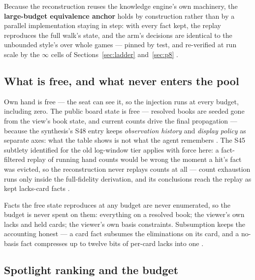 \documentclass[11pt]{article}
\begin{document}
Because the reconstruction reuses the knowledge engine's own machinery, the
\textbf{large-budget equivalence anchor} holds by construction rather than by a parallel
implementation staying in step: with every fact kept, the replay reproduces the full
walk's state, and the arm's decisions are identical to the unbounded style's over whole
games --- pinned by test, and re-verified at run scale by the $\infty$ cells of
Sections~\ref{sec:ladder} and~\ref{sec:p8} \cite{repo,artifact}.

\subsection{What is free, and what never enters the pool}
\label{sec:free}

Own hand is free --- the seat can see it, so the injection runs at every budget,
including zero. The public board state is free --- resolved books are seeded gone from
the view's book state, and current counts drive the final propagation --- because the
synthesis's S48 entry keeps \emph{observation history} and \emph{display policy} as
separate axes: what the table shows is not what the agent remembers \cite{playstyles}.
The S45 subtlety identified for the old log-window tier applies with force here: a
fact-filtered replay of running hand counts would be wrong the moment a hit's fact was
evicted, so the reconstruction never replays counts at all --- count exhaustion runs
only inside the full-fidelity derivation, and its conclusions reach the replay as kept
lacks-card facts \cite{playstyles,repo}.

Facts the free state reproduces at any budget are never enumerated, so the budget is
never spent on them: everything on a resolved book; the viewer's own lacks and held
cards; the viewer's own basis constraints. Subsumption keeps the accounting honest ---
a card fact subsumes the eliminations on its card, and a no-basis fact compresses up to
twelve bits of per-card lacks into one \cite{repo}.

\subsection{Spotlight ranking and the budget}
\label{sec:spotlight}
\end{document}
